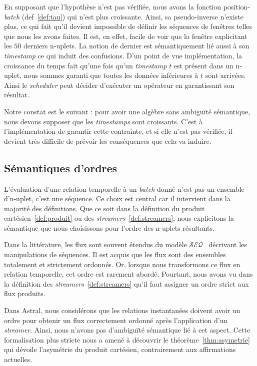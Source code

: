 En supposant que l'hypothèse n'est pas vérifiée, nous avons la fonction position-\textit{batch} (def~\ref{def:tau}) qui n'est plus croissante. Ainsi, sa pseudo-inverse n'existe plus, ce qui fait qu'il devient impossible de définir les séquences de fenêtres telles que nous les avons faites. Il est, en effet, facile de voir que la fenêtre explicitant les $50$ derniers n-uplets. La notion de dernier est sémantiquement lié aussi à son \textit{timestamp} ce qui induit des confusions. D'un point de vue implémentation, la croissance du temps fait qu'une fois qu'un \textit{timestamp} $t$ est présent dans un n-uplet, nous sommes garanti que toutes les données inférieures à $t$ sont arrivées. Ainsi le \textit{scheduler} peut décider d'exécuter un opérateur en garantissant son résultat.

Notre constat est le suivant : pour avoir une algèbre sans ambiguïté sémantique, nous devons supposer que les \textit{timestamps} sont croissants. C'est à l'implémentation de garantir cette contrainte, et si elle n'est pas vérifiée, il devient très difficile de prévoir les conséquences que cela va induire.

\subsection{Sémantiques d'ordres}
L'évaluation d'une relation temporelle à un \textit{batch} donné n'est pas un ensemble d'n-uplet, c'est une séquence. Ce choix est central car il intervient dans la majorité des définitions. Que ce soit dans la définition du produit cartésien~\ref{def:produit} ou des \textit{streamers}~\ref{def:streamers}, nous explicitons la sémantique que nous choisissons pour l'ordre des n-uplets résultants.

Dans la littérature, les flux sont souvent étendus du modèle $\mathcal{SEQ}$~\cite{Seshadri:seq} décrivant les manipulations de séquences. Il est acquis que les flux sont des ensembles totalement et strictement ordonnés. Or, lorsque nous transformons ce flux en relation temporelle, cet ordre est rarement abordé. Pourtant, nous avons vu dans la définition des \textit{streamers}~\ref{def:streamers} qu'il faut assigner un ordre strict aux flux produits. 

Dans Astral, nous considérons que les relations instantanées doivent avoir un ordre pour obtenir un flux correctement ordonné après l'application d'un \textit{streamer}. Ainsi, nous n'avons pas d'ambiguïté sémantique lié à cet aspect. Cette formalisation plus stricte nous a amené à découvrir le théorème~\ref{thm:asymetrie} qui dévoile l'asymétrie du produit cartésien, contrairement aux affirmations actuelles.

